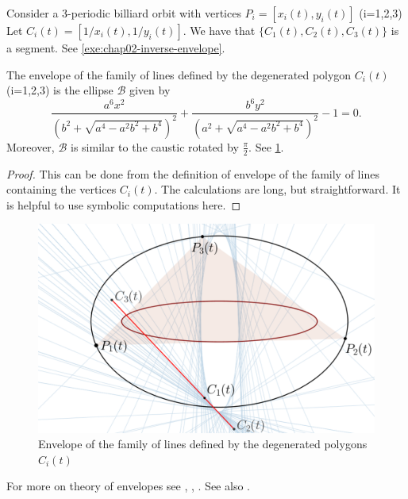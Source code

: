  
 
 
 
 Consider a  3-periodic  billiard orbit with vertices $P_i=[x_i(t),y_i(t)]$ (i=1,2,3)
Let $C_i(t)=[1/x_i(t),1/y_i(t)]$. We have that $\{C_1(t),C_2(t),C_3(t)\}$ is a segment. See \cref{exe:chap02-inverse-envelope}.
\begin{proposition}
    The envelope of the family of lines defined by the degenerated polygon $C_i(t)$ (i=1,2,3) is the ellipse $\mathcal{B}$ given by
    \[ {\frac {{a}^{6}{x}^{2}}{ \left( {b}^{2}+\sqrt {{a}^{4}-{a}^{2}{b}^{2}+
{b}^{4}} \right) ^{2}}}+{\frac {{b}^{6}{y}^{2}}{ \left( {a}^{2}+\sqrt 
{{a}^{4}-{a}^{2}{b}^{2}+{b}^{4}} \right) ^{2}}}-1
=0.
    \]
    Moreover, $\mathcal{B}$ is similar to the caustic rotated by $\frac{\pi}{2}.$ See   \cref{fig:appB-inverso-envelope}.
\end{proposition}
 
\begin{proof}
This can be done from the definition of envelope of the family of lines containing the vertices $C_i(t)$.
The calculations are long, but straightforward.
It is helpful to use symbolic computations here. 
\end{proof}

 \begin{figure}
     \centering
     \includegraphics[scale=0.5]{zappB/pics/pics-appB-040inverso_locus_envelope.png}
     \caption{Envelope of the family of lines defined by the degenerated polygons $C_i(t)$}
     \label{fig:appB-inverso-envelope}
 \end{figure}
 
  For more on theory of envelopes see  \cite[Chapter  3]{arnold-1994},  \cite[pp. 305]{berger-1992}, \cite[Chapter   5]{bruce-1992}.  See also \cite[Cap. 1]{carneiro2019-impa}.
 

 

